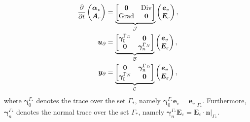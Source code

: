 \begin{equation}\label{eq:syspHelas}
\begin{aligned}
\displaystyle
\diffp{}{t}
\begin{pmatrix}
\bm{\alpha}_v \\
\bm{A}_\varepsilon
\end{pmatrix} &= \underbrace{
\begin{bmatrix}
\bm{0} & \Div \\
\Grad & \bm{0} \\
\end{bmatrix}}_{\mathcal{J}}
\begin{pmatrix}
\bm{e}_v \\
\bm{E}_\varepsilon
\end{pmatrix}, \vspace{3pt}\\
\bm{u}_\partial &= \underbrace{
	\begin{bmatrix}
	\bm\gamma_{0}^{\Gamma_D} & \bm{0} \\
	\bm{0} & \bm\gamma_n^{\Gamma_N} \\
	\end{bmatrix}}_{\mathcal{B}} \begin{pmatrix}
\bm{e}_v \\
\bm{E}_\varepsilon
\end{pmatrix}, \vspace{3pt}\\
\bm{y}_\partial &= \underbrace{
\begin{bmatrix}
\bm{0} & \bm\gamma_{n}^{\Gamma_D} \\
\bm\gamma_0^{\Gamma_N} & \bm{0} \\
\end{bmatrix}}_{\mathcal{C}}
\begin{pmatrix}
\bm{e}_v \\
\bm{E}_\varepsilon
\end{pmatrix},
\end{aligned}
\end{equation}
where $\bm\gamma_{0}^{\Gamma_*}$ denotes the trace over the set $\Gamma_*$, namely $\bm\gamma_{0}^{\Gamma_*}\bm{e}_v = \bm{e}_v\vert_{\Gamma_*}$. Furthermore, $\bm\gamma_{n}^{\Gamma_*}$ denotes the normal trace over the set $\Gamma_*$, namely $\bm\gamma_{n}^{\Gamma_*}\bm{E}_\varepsilon = \bm{E}_\varepsilon \cdot \bm{n}\vert_{\Gamma_*}$.

